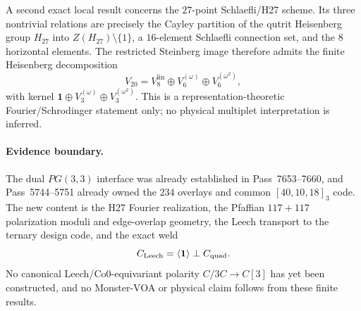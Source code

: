 A second exact local result concerns the $27$-point Schlaefli/H27 scheme.  Its three nontrivial relations are precisely the Cayley partition of the qutrit Heisenberg group $H_{27}$ into $Z(H_{27})\setminus\{1\}$, a $16$-element Schlaefli connection set, and the $8$ horizontal elements.  The restricted Steinberg image therefore admits the finite Heisenberg decomposition
\[
 V_{20}=V_8^{\mathrm{lin}}\oplus V_6^{(\omega)}\oplus V_6^{(\omega^2)},
\]
with kernel $\mathbf1\oplus V_3^{(\omega)}\oplus V_3^{(\omega^2)}$.  This is a representation-theoretic Fourier/Schrodinger statement only; no physical multiplet interpretation is inferred.

\paragraph{Evidence boundary.}
The dual $PG(3,3)$ interface was already established in Pass~7653--7660, and Pass~5744--5751 already owned the $234$ overlays and common $[40,10,18]_3$ code.  The new content is the H27 Fourier realization, the Pfaffian $117+117$ polarization moduli and edge-overlap geometry, the Leech transport to the ternary design code, and the exact weld
\[
 C_{\rm Leech}=\langle\mathbf1\rangle\perp C_{\rm quad}.
\]
No canonical Leech/Co0-equivariant polarity $C/3C\to C[3]$ has yet been constructed, and no Monster-VOA or physical claim follows from these finite results.
